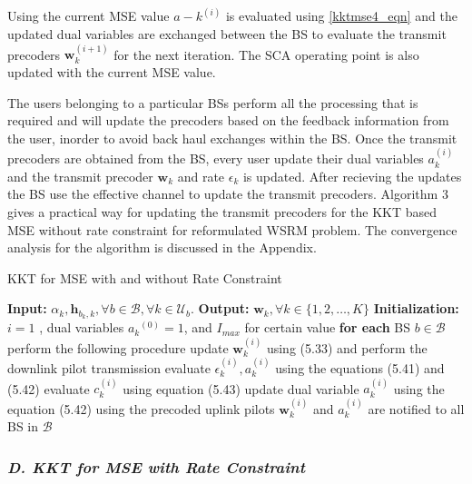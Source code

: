 \documentclass[a4paper, 12pt,titlepage]{dithesis} %
\newcommand{\me}[1]{\( #1 \)}
\begin{document}
Using the current \ac{MSE} value \me{a-k^{(i)}} is evaluated using \eqref{kktmse4_eqn} and the updated dual variables are exchanged between the \ac{BS} to evaluate the transmit precoders \me{\mathbf{w}_k^{(i + 1)}} for the next iteration. The \ac{SCA} operating point is also updated with the current \ac{MSE} value.

The users belonging to a particular \ac{BS}s perform all the processing that is required and will update the precoders based on the feedback information from the user, inorder to avoid back haul exchanges within the \ac{BS}. Once the transmit precoders are obtained from the \ac{BS}, every user update their dual variables \me{a_k^{(i)}} and the transmit precoder \me{\mathbf{w}_k} and rate \me{\epsilon_k} is updated. After recieving the updates the \ac{BS} use the effective channel to update the transmit precoders. Algorithm 3 gives a practical way for updating the transmit precoders for the \ac{KKT} based MSE without rate constraint for reformulated \ac{WSRM} problem. The convergence analysis for the algorithm is discussed in the Appendix.

\begin{algorithm}[h]
	\caption[Distributed Precoder Design]{KKT for MSE with and without Rate Constraint}
	\label{algo-2}
	\begin{algorithmic}
		\label{algo--2}
		\STATE \textbf{Input:} \me{\alpha_k, \mathbf{h}_{b_k,k}, \forall b \in \mathcal{B}, \forall k \in \mathcal{U}_b}.
		\STATE \textbf{Output:} \me{\mathbf{w}_k, \forall k \in \lbrace{1,2,\dotsc,K \rbrace}}
		\STATE \textbf{Initialization:} \me{i = 1} , dual variables	\me{{a_k}^{(0)} = 1}, and \me{I_{max}} for certain value
		\REPEAT
		\STATE \textbf{for each} \ac{BS} \me{b \in \mathcal{B}} perform the following procedure
		\STATE update \me{\mathbf{w}_k^{(i)}} using (5.33) and perform the downlink pilot transmission
		\STATE evaluate \me{\epsilon_k^{(i)}, a_k^{(i)}} using the equations (5.41) and (5.42) 
		\STATE evaluate \me{c_k^{(i)}} using equation (5.43)
		\STATE update dual variable \me{a_k^{(i)}} using the equation (5.42)
		\ENDIF
		\STATE using the precoded uplink pilots \me{\mathbf{w}_k^{(i)}} and \me{a_k^{(i)}} are notified to all \ac{BS} in \me{\mathcal{B}}
		\UNTIL {convergence or \me{i \geq I_{max}}}\\
	\end{algorithmic} 
\end{algorithm}

\subsubsection*{\textit{D. KKT for MSE with Rate Constraint}}
\end{document}
